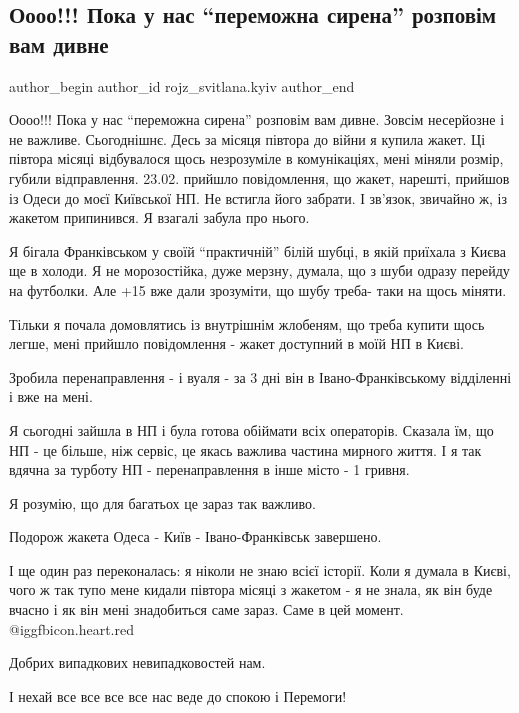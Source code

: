  
 
 
 
 
 
\subsection{Оооо!!! Пока у нас \enquote{переможна сирена} розповім вам дивне}
\label{sec:29_03_2022.fb.rojz_svitlana.kyiv.1.sirena}
 
\ifcmt
 author_begin
   author_id rojz_svitlana.kyiv
 author_end
\fi

Оооо!!! Пока у нас \enquote{переможна сирена} розповім вам дивне. Зовсім
несерйозне і не важливе. Сьогоднішнє. Десь за місяця півтора до
війни я купила жакет. Ці півтора місяці відбувалося щось
незрозуміле в комунікаціях, мені міняли розмір, губили
відправлення. 23.02. прийшло повідомлення, що жакет, нарешті,
прийшов із Одеси до моєї Київської НП. Не встигла його забрати. І
зв'язок, звичайно ж, із жакетом припинився. Я взагалі забула про
нього.

Я бігала Франківськом у своїй \enquote{практичній} білій шубці, в якій приїхала з Києва
ще в холоди. Я не морозостійка, дуже мерзну, думала, що з шуби одразу перейду
на футболки. Але +15 вже дали зрозуміти, що шубу треба- таки на щось міняти.

Тільки я почала домовлятись із внутрішнім жлобеням, що треба купити щось легше,
мені прийшло повідомлення - жакет доступний в моїй НП в Києві.

Зробила перенаправлення - і вуаля - за 3 дні він в Івано-Франківському
відділенні і вже на мені.

Я сьогодні зайшла в НП і була готова обіймати всіх операторів. Сказала їм, що
НП - це більше, ніж сервіс, це якась важлива частина мирного життя. І я так
вдячна за турботу НП - перенаправлення в інше місто - 1 гривня.

Я розумію, що для багатьох це зараз так важливо.

Подорож жакета Одеса - Київ - Івано-Франківськ завершено.

І ще один раз переконалась: я ніколи не знаю всієї історії. Коли я думала в
Києві, чого ж так тупо мене кидали півтора місяці з жакетом - я не знала, як
він буде вчасно і як він мені знадобиться саме зараз. Саме в цей момент. @igg{fbicon.heart.red}

Добрих випадкових невипадковостей нам.

І нехай все все все все нас веде до спокою і Перемоги!
